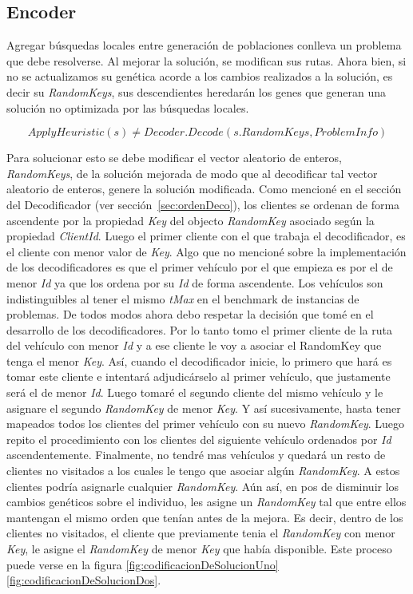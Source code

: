 \subsection{Encoder}

Agregar búsquedas locales entre generación de poblaciones conlleva un problema que debe resolverse. Al mejorar la solución, se modifican sus rutas. Ahora bien, si no se actualizamos su genética acorde a los cambios realizados a la solución, es decir su \textit{RandomKeys}, sus descendientes heredarán los genes que generan una solución no optimizada por las búsquedas locales.

\begin{equation*}
ApplyHeuristic(s) \neq Decoder.Decode(s.RandomKeys, ProblemInfo)
\end{equation*}

Para solucionar esto se debe modificar el vector aleatorio de enteros, \textit{RandomKeys}, de la solución mejorada de modo que al decodificar tal vector aleatorio de enteros, genere la solución modificada. Como mencioné en el sección del Decodificador (ver sección~\ref{sec:ordenDeco}), los clientes se ordenan de forma ascendente por la propiedad \textit{Key} del objecto \textit{RandomKey} asociado según la propiedad \textit{ClientId}. Luego el primer cliente con el que trabaja el decodificador, es el cliente con menor valor de \textit{Key}. Algo que no mencioné sobre la implementación de los decodificadores es que el primer vehículo por el que empieza es por el de menor \textit{Id} ya que los ordena por su \textit{Id} de forma ascendente. Los vehículos son indistinguibles al tener el mismo \textit{tMax} en el benchmark de instancias de problemas. De todos modos ahora debo respetar la decisión que tomé en el desarrollo de los decodificadores. Por lo tanto tomo el primer cliente de la ruta del vehículo con menor \textit{Id} y a ese cliente le voy a asociar el {RandomKey} que tenga el menor \textit{Key}. Así, cuando el decodificador inicie, lo primero que hará es tomar este cliente e intentará adjudicárselo al primer vehículo, que justamente será el de menor \textit{Id}. Luego tomaré el segundo cliente del mismo vehículo y le asignare el segundo \textit{RandomKey} de menor \textit{Key}. Y así sucesivamente, hasta tener mapeados todos los clientes del primer vehículo con su nuevo \textit{RandomKey}. Luego repito el procedimiento con los clientes del siguiente vehículo ordenados por \textit{Id} ascendentemente. Finalmente, no tendré mas vehículos y quedará un resto de clientes no visitados a los cuales le tengo que asociar algún \textit{RandomKey}. A estos clientes podría asignarle cualquier \textit{RandomKey}. Aún así, en pos de disminuir los cambios genéticos sobre el individuo, les asigne un \textit{RandomKey} tal que entre ellos mantengan el mismo orden que tenían antes de la mejora. Es decir, dentro de los clientes no visitados, el cliente que previamente tenia el \textit{RandomKey} con menor \textit{Key}, le asigne el \textit{RandomKey} de menor \textit{Key} que había disponible.  Este proceso puede verse en la figura \ref{fig:codificacionDeSolucionUno} \ref{fig:codificacionDeSolucionDos}.

